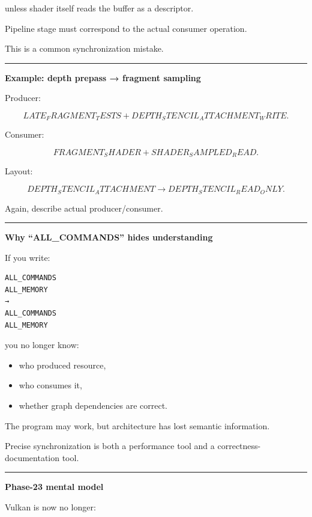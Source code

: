 unless shader itself reads the buffer as a descriptor.

Pipeline stage must correspond to the actual consumer operation.

This is a common synchronization mistake.

\begin{center}\rule{0.5\linewidth}{0.5pt}\end{center}

\textbf{Example: depth prepass → fragment sampling}

Producer:

\[
LATE_FRAGMENT_TESTS
+
DEPTH_STENCIL_ATTACHMENT_WRITE.
\]

Consumer:

\[
FRAGMENT_SHADER
+
SHADER_SAMPLED_READ.
\]

Layout:

\[
DEPTH_STENCIL_ATTACHMENT
\rightarrow
DEPTH_STENCIL_READ_ONLY.
\]

Again, describe actual producer/consumer.

\begin{center}\rule{0.5\linewidth}{0.5pt}\end{center}

\textbf{Why ``ALL\_COMMANDS'' hides understanding}

If you write:

\begin{verbatim}
ALL_COMMANDS
ALL_MEMORY
→
ALL_COMMANDS
ALL_MEMORY
\end{verbatim}

you no longer know:

\begin{itemize}
\tightlist
\item
  who produced resource,
\item
  who consumes it,
\item
  whether graph dependencies are correct.
\end{itemize}

The program may work, but architecture has lost semantic information.

Precise synchronization is both a performance tool and a correctness-documentation tool.

\begin{center}\rule{0.5\linewidth}{0.5pt}\end{center}

\textbf{Phase-23 mental model}

Vulkan is now no longer:

